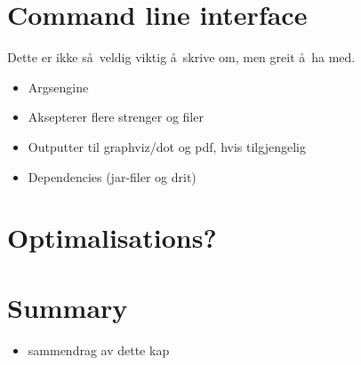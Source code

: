 \section{Command line interface}
Dette er ikke s\aa~veldig viktig \aa~skrive om, men greit \aa~ha med.
\begin{itemize}
  \item Argsengine
  \item Aksepterer flere strenger og filer
  \item Outputter til graphviz/dot og pdf, hvis tilgjengelig
  \item Dependencies (jar-filer og drit)
\end{itemize}

\section{Optimalisations?}

\section{Summary}
\label{sect:impl:summary}
\begin{itemize}
  \item sammendrag av dette kap
\end{itemize}